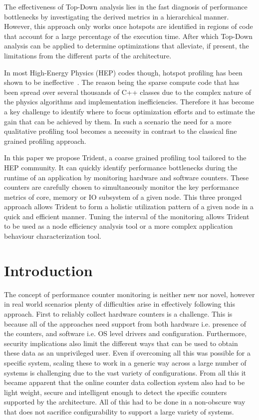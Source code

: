 \documentclass{webofc}
\begin{document}
The effectiveness of Top-Down analysis lies in the fast diagnosis of performance bottlenecks by investigating the derived metrics in a hierarchical manner. However, this approach only works once hotspots are identified in regions of code that account for a large percentage of the execution time. After which Top-Down analysis can be applied to determine optimizations that alleviate, if present, the limitations from the different parts of the architecture. 

In most High-Energy Physics (HEP) codes though, hotspot profiling has been shown to be ineffective~\cite{}. The reason being the sparse compute code that has been spread over several thousands of C++ classes due to the complex nature of the physics algorithms and implementation inefficiencies. Therefore it has become a key challenge to identify where to focus optimization efforts and to estimate the gain that can be achieved by them. In such a scenario the need for a more qualitative profiling tool becomes a necessity in contrast to the classical fine grained profiling approach.

In this paper we propose Trident, a coarse grained profiling tool tailored to the HEP community. It can quickly identify performance bottlenecks during the runtime of an application by monitoring hardware and software counters. These counters are carefully chosen to simultaneously monitor the key performance metrics of core, memory or IO subsystem of a given node. This three pronged approach allows Trident to form a holistic utilization pattern of a given node in a quick and efficient manner. Tuning the interval of the monitoring allows Trident to be used as a node efficiency analysis tool or a more complex application behaviour characterization tool.

\section{Introduction}
\label{sec:intro}

The concept of performance counter monitoring is neither new nor novel, however in real world scenarios plenty of difficulties arise in effectively following this approach. First to reliably collect hardware counters is a challenge. This is because all of the approaches need support from both hardware i.e. presence of the counters, and software i.e. OS level drivers and configuration. Furthermore, security implications also limit the different ways that can be used to obtain these data as an unprivileged user. Even if overcoming all this was possible for a specific system, scaling these to work in a generic way across a large number of systems is challenging due to the vast variety of configurations. From all this it became apparent that the online counter data collection system also had to be light weight, secure and intelligent enough to detect the specific counters supported by the architecture. All of this had to be done in a non-obscure way that does not sacrifice configurability to support a large variety of systems.
\end{document}
